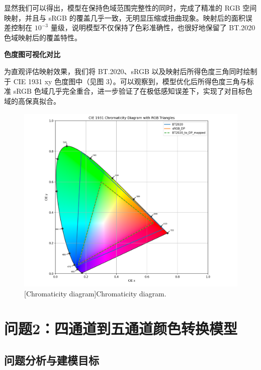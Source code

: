 显然我们可以得出，模型在保持色域范围完整性的同时，完成了精准的 RGB 空间映射，并且与 sRGB 的覆盖几乎一致，无明显压缩或扭曲现象。映射后的面积误差控制在 $10^{-3}$ 量级，说明模型不仅保持了色彩准确性，也很好地保留了 BT.2020 色域映射后的覆盖特性。

 \textbf{色度图可视化对比}

为直观评估映射效果，我们将 BT.2020、sRGB 以及映射后所得色度三角同时绘制于 CIE 1931 xy 色度图中（见图 3）。可以观察到，模型优化后所得色度三角与标准 sRGB 色域几乎完全重合，进一步验证了在极低感知误差下，实现了对目标色域的高保真拟合。

\begin{figure}[h]
\centering
{}
\includegraphics[width=0.8\columnwidth]{figures/色度.png}
[Chromaticity diagram]{Chromaticity diagram.}
\label{figure3: 色度图}
\end{figure}

\section[\hspace{-2pt}问题2：四通道到五通道颜色转换模型]{{\heiti{} \hspace{-8pt}问题2：四通道到五通道颜色转换模型}}\label{section3: 问题2：四通道到五通道颜色转换模型}

\subsection[\hspace{-2pt}问题分析与建模目标]{{\heiti{} \hspace{-8pt}问题分析与建模目标}}\label{section2: 问题分析与建模目标}

